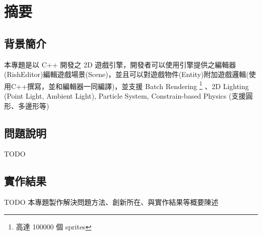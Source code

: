 \chapter{摘要}

\section{背景簡介}

本專題是以 C++ 開發之 2D 遊戲引擎，開發者可以使用引擎提供之編輯器(RishEditor)編輯遊戲場景(Scene)，並且可以對遊戲物件(Entity)附加遊戲邏輯(使用C++撰寫，並和編輯器一同編譯)，並支援 Batch Rendering \footnote{高達 100000 個 sprites} 、2D Lighting (Point Light, Ambient Light), Particle System, Constrain-based Physics (支援圓形、多邊形等)

\section{問題說明}

TODO

\section{實作結果}

TODO 本專題製作解決問題方法、創新所在、與實作結果等概要陳述

\newpage